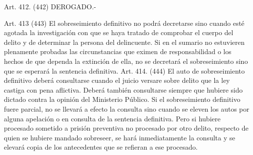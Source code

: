     Art. 412. (442) DEROGADO.-


    Art. 413 (443) El sobreseimiento definitivo no podrá decretarse sino cuando esté agotada la investigación con que se haya tratado de comprobar el cuerpo del delito y de determinar la persona del delincuente.
    Si en el sumario no estuvieren plenamente probadas las circunstancias que eximen de responsabilidad o los hechos de que dependa la extinción de ella, no se decretará el sobreseimiento sino que se esperará la sentencia definitiva.
    Art. 414. (444) El auto de sobreseimiento definitivo deberá consultarse cuando el juicio versare sobre delito que la ley castiga con pena aflictiva.
    Deberá también consultarse siempre que hubiere sido dictado contra la opinión del Ministerio Público.
    Si el sobreseimiento definitivo fuere parcial, no se llevará a efecto la consulta sino cuando se eleven los autos por alguna apelación o en consulta de la sentencia definitiva. Pero si hubiere procesado sometido a prisión preventiva no procesado por otro delito, respecto de quien se hubiere mandado sobreseer, se hará inmediatamente la consulta y se elevará copia de los antecedentes que se refieran a ese procesado.


